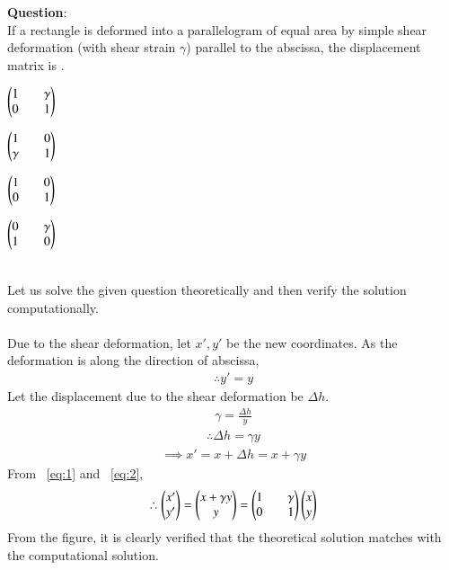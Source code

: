 \documentclass[journal]{IEEEtran}
\begin{document}
\textbf{Question}:\\
If a rectangle is deformed into a parallelogram of equal area by simple shear deformation (with shear strain $\gamma$) parallel to the abscissa, the displacement matrix is \underline{\hspace{2cm}}.
\begin{enumerate}
\begin{multicols}{2}
    \item $\begin{pmatrix}1&&\gamma\\0&&1\end{pmatrix}$
    \item $\begin{pmatrix}1&&0\\\gamma&&1\end{pmatrix}$
    \item $\begin{pmatrix}1&&0\\0&&1\end{pmatrix}$
    \item $\begin{pmatrix}0&&\gamma\\1&&0\end{pmatrix}$
\end{multicols}
\end{enumerate}
\solution \\
Let us solve the given question theoretically and then verify the solution computationally.\\
\\
Due to the shear deformation, let $x',y'$ be the new coordinates. As the deformation is along the direction of abscissa,
\begin{align}
    \therefore y'=y \label{eq:1}
\end{align}
Let the displacement due to the shear deformation be $\Delta h$.
\begin{align}
    \gamma=\frac{\Delta h}{y}
\end{align}
\begin{align}
    \therefore \Delta h=\gamma y
\end{align}
\begin{align}
    \implies x'=x+\Delta h=x+\gamma y \label{eq:2}
\end{align}
From ~\eqref{eq:1} and ~\eqref{eq:2},
\begin{align}
    \therefore \begin{pmatrix}x'\\y'\end{pmatrix}=\begin{pmatrix}x+\gamma y \\ y\end{pmatrix}=\begin{pmatrix}1&&\gamma\\0&&1\end{pmatrix}\begin{pmatrix}x\\y\end{pmatrix}
\end{align}
\newpage
\vspace*{0.25cm}
From the figure, it is clearly verified that the theoretical solution matches with the computational solution.\\
\end{document}
